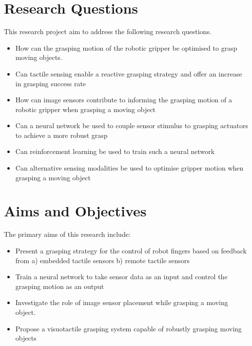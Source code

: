 \section{Research Questions}
This research project aim to address the following research questions.
\begin{itemize}
\item How can the grasping motion of the robotic gripper be optimised to grasp moving objects. 
\item Can tactile sensing enable a reactive grasping strategy and offer an increase in grasping success rate 
\item How can image sensors contribute to informing the grasping motion of a robotic gripper when grasping a moving object
\item Can a neural network be used to couple sensor stimulus to grasping actuators to achieve a more robust grasp
\item Can reinforcement learning be used to train such a neural network
\item Can alternative sensing modalities be used to optimise gripper motion when grasping a moving object
\end{itemize}

\section{Aims and Objectives}
The primary aims of this research include:

\begin{itemize}
    
\item Present a grasping strategy for the control of robot fingers based on feedback from a) embedded tactile sensors b) remote tactile sensors
\item Train a neural network to take sensor data as an input and control the grasping motion as an output
\item Investigate the role of image sensor placement while grasping a moving object.
\item Propose a visuotactile grasping system capable of robustly grasping moving objects
\end{itemize}

